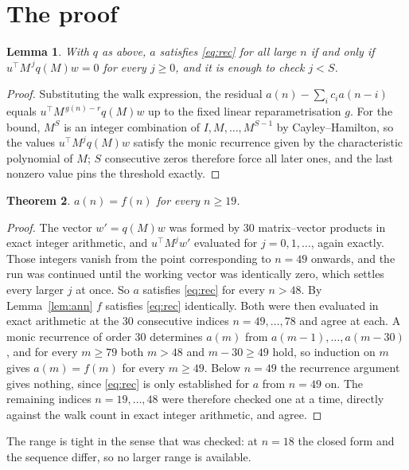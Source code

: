 \documentclass[11pt,a4paper]{article}
\theoremstyle{plain}
\newtheorem{theorem}{Theorem}
\newtheorem{lemma}[theorem]{Lemma}
\theoremstyle{definition}
\begin{document}
\section{The proof}

\begin{lemma}\label{lem:crit}
With $q$ as above, $a$ satisfies \eqref{eq:rec} for all large $n$ if and only if
$u^{\!\top}M^{\,j}q(M)w=0$ for every $j\ge0$, and it is enough to check $j<S$.
\end{lemma}

\begin{proof}
Substituting the walk expression, the residual $a(n)-\sum_ic_ia(n-i)$ equals
$u^{\!\top}M^{\,g(n)-r}q(M)w$ up to the fixed linear reparametrisation $g$. For the bound,
$M^{S}$ is an integer combination of $I,M,\dots,M^{S-1}$ by Cayley--Hamilton, so the values
$u^{\!\top}M^{j}q(M)w$ satisfy the monic recurrence given by the characteristic polynomial of
$M$; $S$ consecutive zeros therefore force all later ones, and the last nonzero value pins the
threshold exactly.
\end{proof}

\begin{theorem}
$a(n)=f(n)$ for every $n\ge19$.
\end{theorem}

\begin{proof}
The vector $w'=q(M)w$ was formed by $30$ matrix--vector products in exact integer
arithmetic, and $u^{\!\top}M^{j}w'$ evaluated for $j=0,1,\dots$, again exactly. Those integers
vanish from the point corresponding to $n=49$ onwards, and the run was continued until the
working vector was identically zero, which settles every larger $j$ at once. So $a$ satisfies
\eqref{eq:rec} for every $n>48$. By Lemma~\ref{lem:ann} $f$ satisfies \eqref{eq:rec}
identically. Both were then evaluated in exact arithmetic at the $30$ consecutive indices
$n=49,\dots,78$ and agree at each. A monic recurrence of order $30$
determines $a(m)$ from $a(m-1),\dots,a(m-30)$, and for every $m\ge79$ both
$m>48$ and $m-30\ge49$ hold, so induction on $m$ gives $a(m)=f(m)$ for every
$m\ge49$.
Below $n=49$ the recurrence argument gives nothing, since \eqref{eq:rec} is only
established for $a$ from $n=49$ on. The remaining indices $n=19,\dots,48$ were
therefore checked one at a time, directly against the walk count in exact integer arithmetic,
and agree.
\end{proof}

The range is tight in the sense that was checked: at $n=18$ the closed form and the sequence differ, so no larger range is available.
\end{document}
